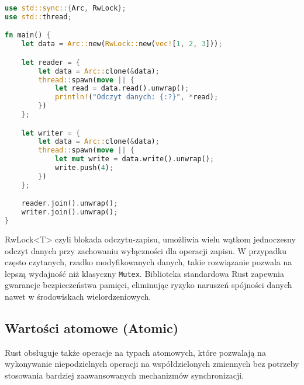 \begin{lstlisting}[language=Rust, caption=Przykład użycia RwLock, label=rwlock_example]
use std::sync::{Arc, RwLock};
use std::thread;

fn main() {
    let data = Arc::new(RwLock::new(vec![1, 2, 3]));

    let reader = {
        let data = Arc::clone(&data);
        thread::spawn(move || {
            let read = data.read().unwrap();
            println!("Odczyt danych: {:?}", *read);
        })
    };

    let writer = {
        let data = Arc::clone(&data);
        thread::spawn(move || {
            let mut write = data.write().unwrap();
            write.push(4);
        })
    };

    reader.join().unwrap();
    writer.join().unwrap();
}
\end{lstlisting}
RwLock<T>  czyli blokada odczytu-zapisu, umożliwia wielu wątkom jednoczesny odczyt danych przy zachowaniu wyłączności dla operacji zapisu. W przypadku często czytanych, rzadko modyfikowanych danych, takie rozwiązanie pozwala na lepszą wydajność niż klasyczny \texttt{Mutex}. Biblioteka standardowa Rust zapewnia gwarancje bezpieczeństwa pamięci, eliminując ryzyko naruszeń spójności danych nawet w środowiskach wielordzeniowych.  
\subsection{Wartości atomowe (Atomic)}

Rust obsługuje także operacje na typach atomowych, które pozwalają na wykonywanie niepodzielnych operacji na współdzielonych zmiennych bez potrzeby stosowania bardziej zaawansowanych mechanizmów synchronizacji.

